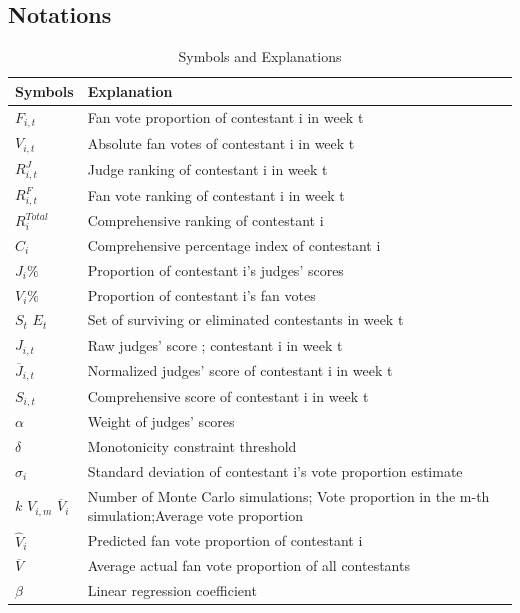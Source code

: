 \documentclass{mcmthesis}
\begin{document}
\subsection{Notations}
\begin{table}[h]
\centering
\caption{Symbols and Explanations}
\begin{tabular}{p{}p{}}
\hline
\textbf{Symbols} & \textbf{Explanation} \\
\hline

$F_{i,t}$ & Fan vote proportion of contestant i in week t\\
$V_{i,t}$ & Absolute fan votes of contestant i in week t\\
$R^J_{i,t}$ & Judge ranking of contestant i in week t \\
$R^F_{i,t}$ & Fan vote ranking of contestant i in week t\\
$R_{i}^{Total}$ & Comprehensive ranking of contestant i \\
$C_{i}$ & Comprehensive percentage index of contestant i \\
$J_{i}\%$ & Proportion of contestant i's judges' scores \\
$V_{i}\%$ & Proportion of contestant i's fan votes \\
$S_t$ $E_t$ & Set of surviving or eliminated contestants in week t \\
$J_{i,t}$ & Raw judges' score ; contestant i in week t \\
$\overline{J}_{i,t}$ & Normalized judges' score of contestant i in week t \\
$S_{i,t}$ & Comprehensive score of contestant i in week t \\
$\alpha$ & Weight of judges' scores \\
$\delta$ & Monotonicity constraint threshold \\
$\sigma_{i}$ & Standard deviation of contestant i's vote proportion estimate \\
$k$ $V_{i,m}$ $\overline{V}_{i}$ & Number of Monte Carlo simulations; Vote proportion in the m-th simulation;Average vote proportion\\
$\hat{V}_{i}$ & Predicted fan vote proportion of contestant i \\
$\overline{V}$ & Average actual fan vote proportion of all contestants \\
$\beta$ & Linear regression coefficient \\
\hline
\end{tabular}
\end{table}
\end{document}
